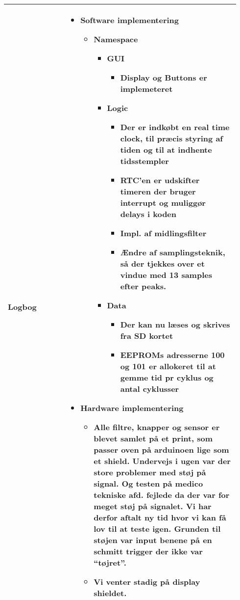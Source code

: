 \begin{longtable}{|p{0.24\linewidth}|p{0.7\linewidth}|}
		\\ \hline
		Logbog & 
		\begin{itemize}
			\item Software implementering
			\begin{itemize}
				\item Namespace
				\begin{itemize}
					\item GUI
					\begin{itemize}
						\item Display og Buttons er implemeteret 
					\end{itemize}
					\item Logic
					\begin{itemize}
						\item Der er indkøbt en real time clock, til præcis styring af tiden og til at indhente tidsstempler
						\item RTC’en er udskifter timeren der bruger interrupt og muliggør delays i koden
						\item Impl. af midlingsfilter 
						\item Ændre af samplingsteknik, så der tjekkes over et vindue med 13 samples efter peaks. 
					\end{itemize}
					\item Data 
					\begin{itemize}
						\item Der kan nu læses og skrives fra SD kortet
						\item EEPROMs adresserne 100 og 101 er allokeret til at gemme tid pr cyklus og antal cyklusser
					\end{itemize}
				\end{itemize}
			\end{itemize}
			\item Hardware implementering 
			\begin{itemize}
				\item Alle filtre, knapper og sensor er blevet samlet på et print, som passer oven på arduinoen lige som et shield. Undervejs i ugen var der store problemer med støj på signal. Og testen på medico tekniske afd. fejlede da der var for meget støj på signalet. Vi har derfor aftalt ny tid hvor vi kan få lov til at teste igen. Grunden til støjen var input benene på en schmitt trigger der ikke var “tøjret”. 
				\item Vi venter stadig på display shieldet. 
			\end{itemize}
		\end{itemize}
		\\ \hline
	\end{longtable}
	
